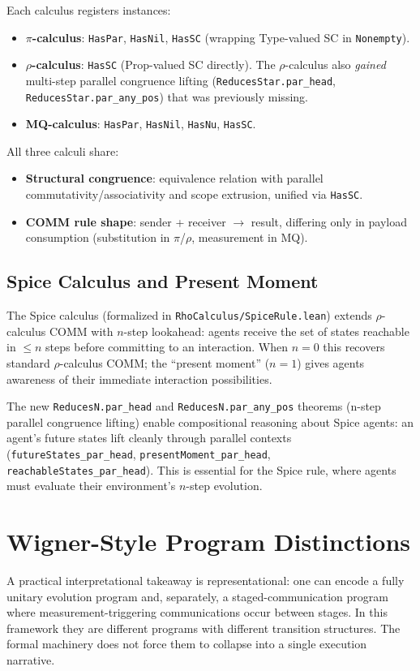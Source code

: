 \documentclass[11pt]{article}
\begin{document}
Each calculus registers instances:
\begin{itemize}[leftmargin=1.5em]
  \item \textbf{$\pi$-calculus}: \texttt{HasPar}, \texttt{HasNil}, \texttt{HasSC}
    (wrapping Type-valued SC in \texttt{Nonempty}).
  \item \textbf{$\rho$-calculus}: \texttt{HasSC} (Prop-valued SC directly).
    The $\rho$-calculus also \emph{gained} multi-step parallel congruence lifting
    (\texttt{ReducesStar.par\_head}, \texttt{ReducesStar.par\_any\_pos}) that was
    previously missing.
  \item \textbf{MQ-calculus}: \texttt{HasPar}, \texttt{HasNil}, \texttt{HasNu},
    \texttt{HasSC}.
\end{itemize}

All three calculi share:
\begin{itemize}[leftmargin=1.5em]
  \item \textbf{Structural congruence}: equivalence relation with parallel
    commutativity/associativity and scope extrusion, unified via \texttt{HasSC}.
  \item \textbf{COMM rule shape}: sender + receiver $\to$ result,
    differing only in payload consumption (substitution in $\pi$/$\rho$,
    measurement in MQ).
\end{itemize}

\subsection{Spice Calculus and Present Moment}

The Spice calculus (formalized in \texttt{RhoCalculus/SpiceRule.lean})
extends $\rho$-calculus COMM with $n$-step lookahead: agents receive
the set of states reachable in $\leq n$ steps before committing to an
interaction.  When $n = 0$ this recovers standard $\rho$-calculus COMM;
the ``present moment'' ($n = 1$) gives agents awareness of their immediate
interaction possibilities.

The new \texttt{ReducesN.par\_head} and \texttt{ReducesN.par\_any\_pos}
theorems (n-step parallel congruence lifting) enable compositional
reasoning about Spice agents: an agent's future states lift cleanly through
parallel contexts (\texttt{futureStates\_par\_head},
\texttt{presentMoment\_par\_head}, \texttt{reachableStates\_par\_head}).
This is essential for the Spice rule, where agents must evaluate their
environment's $n$-step evolution.

\section{Wigner-Style Program Distinctions}
A practical interpretational takeaway is representational: one can encode a fully unitary evolution program and, separately, a staged-communication program where measurement-triggering communications occur between stages. In this framework they are different programs with different transition structures. The formal machinery does not force them to collapse into a single execution narrative.
\end{document}
